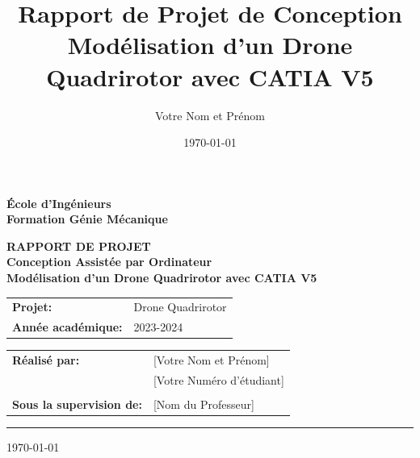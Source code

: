 \documentclass[a4paper,12pt]{report}
\title{\Huge{\textbf{Rapport de Projet de Conception}}\\\Large{Modélisation d'un Drone Quadrirotor avec CATIA V5}}
\author{Votre Nom et Prénom}
\date{\today}
\begin{document}
\begin{titlepage}
    \begin{center}
        \vspace*{1cm}
        
        \textbf{\LARGE{École d'Ingénieurs}} \\
        \vspace{0.5cm}
        \textbf{\Large{Formation Génie Mécanique}}
        
        \vspace{2cm}
        
        
        \vspace{2cm}
        
        \textbf{\Huge{RAPPORT DE PROJET}}\\
        \vspace{0.5cm}
        \textbf{\LARGE{Conception Assistée par Ordinateur}}\\
        \vspace{1cm}
        \textbf{\huge{Modélisation d'un Drone Quadrirotor avec CATIA V5}}
        
        \vspace{1.5cm}
        
        \begin{tabular}{l l}
            \textbf{Projet:} & Drone Quadrirotor \\
            \textbf{Année académique:} & 2023-2024 \\
        \end{tabular}
        
        \vfill
        
        \begin{tabular}{l l}
            \textbf{Réalisé par:} & [Votre Nom et Prénom] \\
            & [Votre Numéro d'étudiant] \\
            \\
            \textbf{Sous la supervision de:} & [Nom du Professeur] \\
        \end{tabular}
        
        \vspace{1cm}
        
        \begin{center}
            \rule{0.5\textwidth}{0.5pt}
        \end{center}
        
        \vspace{0.5cm}
        
        {\Large{\today}}
        
    \end{center}
\end{titlepage}
\end{document}
